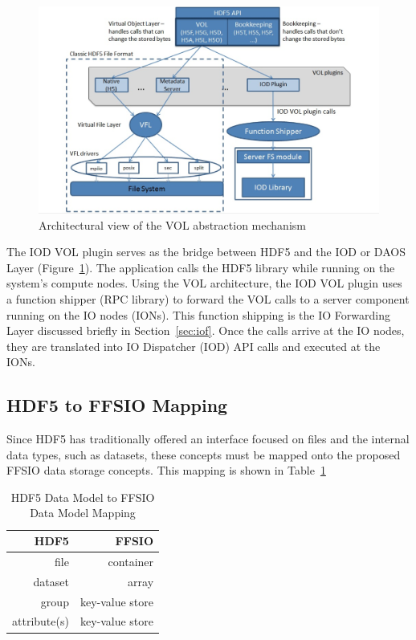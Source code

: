 \documentclass[conference]{IEEEtran}
\begin{document}
\begin{figure}[htbp]
\vspace{-0.10in}
\centering
\includegraphics[width=\columnwidth]{images/vol-arch.png}
\vspace{-0.10in}
\caption{Architectural view of the VOL abstraction mechanism}
\label{fig:vol-arch}
\vspace{-0.10in}
\end{figure}

The IOD VOL plugin serves as the bridge between HDF5 and the IOD or DAOS Layer
(Figure~\ref{fig:vol-arch}). The application calls the HDF5 library while
running on the system's compute nodes. Using the VOL architecture, the IOD VOL
plugin uses a function shipper (RPC library) to forward the VOL calls to a
server component running on the IO nodes (IONs). This function shipping is the
IO Forwarding Layer discussed briefly in Section~\ref{sec:iof}. Once the calls
arrive at the IO nodes, they are translated into IO Dispatcher (IOD) API calls
and executed at the IONs.

\subsection{HDF5 to FFSIO Mapping}
\label{sec:hdf-to-ffsio}

Since HDF5 has traditionally offered an interface focused on files and the
internal data types, such as datasets, these concepts must be mapped onto the
proposed FFSIO data storage concepts. This mapping is shown in Table~\ref{tab:mapping}

\begin{table}[ht]
    \vspace{-0.10in}
    \centering
    \caption[HDF5 to FFSIO Mapping]{HDF5 Data Model to FFSIO Data Model Mapping}
    \bigskip
    \vspace{-0.15in}

    \begin{tabular}{|r|r|}
\hline
HDF5 & FFSIO\\
\hline
file & container \\
dataset & array \\
group & key-value store \\
attribute(s) & key-value store \\
\hline
    \end{tabular}
    \label{tab:mapping}
\end{table}
\end{document}
